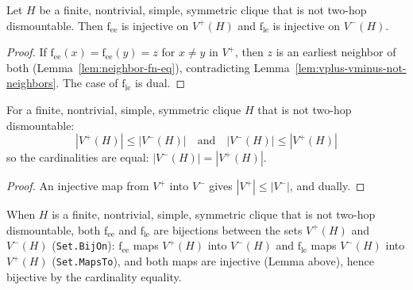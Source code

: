 \begin{lemma}
  \label{lem:neighbor-fn-injective}
  \leanok
  Let $H$ be a finite, nontrivial, simple, symmetric clique that is not
  two-hop dismountable. Then $\mathrm{f_{ee}}$ is injective on $V^+(H)$ and
  $\mathrm{f_{le}}$ is injective on $V^-(H)$.
\end{lemma}

\begin{proof}
  \leanok
  If $\mathrm{f_{ee}}(x) = \mathrm{f_{ee}}(y) = z$ for $x \neq y$ in $V^+$, then $z$ is an earliest neighbor of both (Lemma~\ref{lem:neighbor-fn-eq}), contradicting Lemma~\ref{lem:vplus-vminus-not-neighbors}. The case of $\mathrm{f_{le}}$ is dual.
\end{proof}

\begin{lemma}
  \label{lem:card-bounds}
  \leanok
  For a finite, nontrivial, simple, symmetric clique $H$ that is not
  two-hop dismountable:
  $$|V^+(H)| \le |V^-(H)| \quad \text{and} \quad |V^-(H)| \le |V^+(H)|$$
  so the cardinalities are equal: $|V^-(H)| = |V^+(H)|$.
\end{lemma}

\begin{proof}
  \leanok
  An injective map from $V^+$ into $V^-$ gives $|V^+| \le |V^-|$, and dually.
\end{proof}

\begin{theorem}
  \label{thm:neighbor-fn-bijective}
  \leanok
  When $H$ is a finite, nontrivial, simple, symmetric clique that is not
  two-hop dismountable, both $\mathrm{f_{ee}}$ and $\mathrm{f_{le}}$ are bijections between the
  sets $V^+(H)$ and $V^-(H)$ (\texttt{Set.BijOn}): $\mathrm{f_{ee}}$ maps $V^+(H)$ into
  $V^-(H)$ and $\mathrm{f_{le}}$ maps $V^-(H)$ into $V^+(H)$
  (\texttt{Set.MapsTo}), and both maps are injective (Lemma above), hence
  bijective by the cardinality equality.
\end{theorem}

